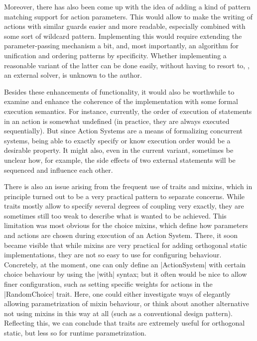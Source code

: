 Moreover, there has also been come up with the idea of adding a kind of pattern matching support for
action parameters. This would allow to make the writing of actions with similar guards easier and
more readable, especially combined with some sort of wildcard pattern. Implementing this would
require extending the parameter-passing mechanism a bit, and, most importantly, an algorithm for
unification and ordering patterns by specificity. Whether implementing a reasonable variant of the
latter can be done easily, without having to resort to, \eg, an external solver, is unknown to the
author.

Besides these enhancements of functionality, it would also be worthwhile to examine and enhance the
coherence of the implementation with some formal execution semantics. For instance, currently, the
order of execution of statements in an action is somewhat undefined (in practice, they are always
executed sequentially). But since Action Systems are a means of formalizing concurrent systems,
being able to exactly specify or know execution order would be a desirable property. It might also,
even in the current variant, sometimes be unclear how, for example, the side effects of two external
statements will be sequenced and influence each other.

There is also an issue arising from the frequent use of traits and mixins, which in principle turned
out to be a very practical pattern to separate concerns. While traits mostly allow to specify
several degrees of coupling very exactly, they are sometimes still too weak to describe what is
wanted to be achieved. This limitation was most obvious for the choice mixins, which define how
parameters and actions are chosen during execution of an Action System. There, it soon became
visible that while mixins are very practical for adding orthogonal static implementations, they are
not so easy to use for configuring behaviour. Concretely, at the moment, one can only define an
|ActionSystem| with certain choice behaviour by using the |with| syntax; but it often would be nice
to allow finer configuration, such as setting specific weights for actions in the |RandomChoice|
trait. Here, one could either investigate ways of elegantly allowing parametrization of mixin
behaviour, or think about another alternative not using mixins in this way at all (such as a
conventional design pattern). Reflecting this, we can conclude that traits are extremely useful for
orthogonal static, but less so for runtime parametrization.

